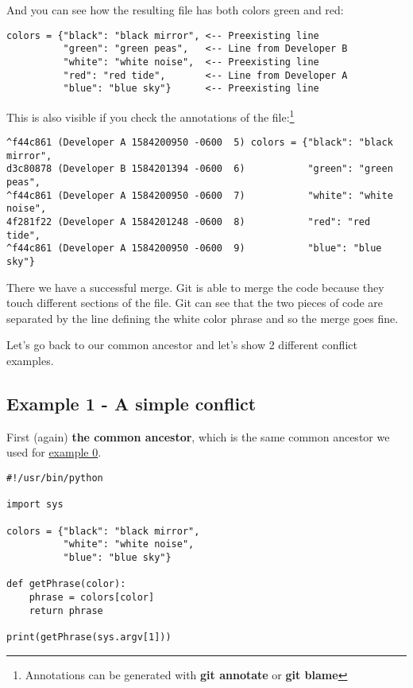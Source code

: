And you can see how the resulting file has both colors green and red:
\begin{lstlisting}[style=code_section_style, firstnumber=5, caption={\bf Example 0} - colors section]
colors = {"black": "black mirror", <-- Preexisting line
          "green": "green peas",   <-- Line from Developer B
          "white": "white noise",  <-- Preexisting line
          "red": "red tide",       <-- Line from Developer A
          "blue": "blue sky"}      <-- Preexisting line
\end{lstlisting}

This is also visible if you check the annotations of the file:\footnote{Annotations can be generated with
{\bf git annotate} or {\bf git blame}}

\begin{lstlisting}[style=console_style, basicstyle=\small, caption={\bf Example 0} - annotations]
^f44c861 (Developer A 1584200950 -0600  5) colors = {"black": "black mirror",
d3c80878 (Developer B 1584201394 -0600  6)           "green": "green peas",
^f44c861 (Developer A 1584200950 -0600  7)           "white": "white noise",
4f281f22 (Developer A 1584201248 -0600  8)           "red": "red tide",
^f44c861 (Developer A 1584200950 -0600  9)           "blue": "blue sky"}
\end{lstlisting}

There we have a successful merge. Git is able to merge the code because they touch different sections of the file.
Git can see that the two pieces of code are separated by the line defining the white color phrase and so the merge
goes fine.

Let's go back to our common ancestor and let's show 2 different conflict examples.
\subsection{Example 1 - A simple conflict}
\label{example_01}

First (again) {\bf the common ancestor}, which is the same common ancestor we used for \hyperref[example_00]{example 0}.
\begin{lstlisting}[style=python_style, caption={\bf Example 1} - common ancestor]
#!/usr/bin/python

import sys

colors = {"black": "black mirror",
          "white": "white noise",
          "blue": "blue sky"}

def getPhrase(color):
    phrase = colors[color]
    return phrase

print(getPhrase(sys.argv[1]))
\end{lstlisting}

